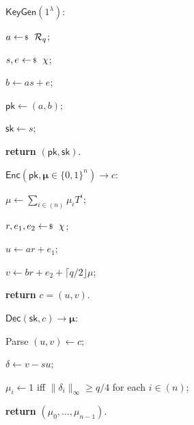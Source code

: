 \documentclass[../../book.tex]{subfiles}
\begin{document}
\begin{algoproto}[ht]
    \small
    \centering
    \begin{mdframed}[linecolor=black, linewidth=1pt,
                     skipabove=10pt, skipbelow=10pt,
                     innerleftmargin=5pt, innerrightmargin=5pt]
        \begin{minipage}[t]{0.25\linewidth}
            \colorbox{oc-blue-1}{$\mathsf{KeyGen}(1^{\lambda})$:}
            \begin{algoen}
                \item $a \leftarrowS \mathcal{R}_q$;
                \item $s, e \leftarrowS \chi$;
                \item $b \gets as + e$;
                \item $\mathsf{pk} \gets (a, b)$;
                \item $\mathsf{sk} \gets s$;
                \item \textbf{return} $(\mathsf{pk}, \mathsf{sk})$.
            \end{algoen}
        \end{minipage}
        \hfill
        \begin{minipage}[t]{0.35\linewidth}
            \colorbox{oc-blue-1}{$\mathsf{Enc}(\mathsf{pk}, \boldsymbol{\mu} \in \{0,1\}^n) \to c$:}
            \begin{algoen}
                \item $\mu \gets \sum_{i \in (n)} \mu_i T^i$;
                \item $r, e_1, e_2 \leftarrowS \chi$;
                \item $u \gets ar + e_1$;
                \item $v \gets br + e_2 + \lceil q/2 \rfloor \mu$;
                \item \textbf{return} $c = (u, v)$.
            \end{algoen}
        \end{minipage}
        \hfill
        \begin{minipage}[t]{0.35\linewidth}
            \colorbox{oc-blue-1}{$\mathsf{Dec}(\mathsf{sk}, c) \to \boldsymbol{\mu}$:}
            \begin{algoen}
                \item Parse $(u, v) \gets c$;
                \item $\delta \gets v - su$;
                \item $\mu_i \gets 1$ iff $\|\delta_i\|_{\infty} \geq q/4$ for each $i \in (n)$;
                \item \textbf{return} $(\mu_0,\dots,\mu_{n-1})$.
            \end{algoen}
        \end{minipage}
    \end{mdframed}
    \caption{Key generation, encryption, and decryption in the Ring-LWE-based scheme $\Pi_{\mathsf{PKE}}^{\text{RLWE}}$ over $\mathcal{R}_q = \mathbb{Z}_q[T]/(T^n+1)$, where $\chi$ is a short distribution over $S_{\eta} \subseteq \mathcal{R}_q$ and $\delta_i$ denotes the $i$-th coefficient of $\delta$.}
    \label{fig:rlwe-pke}
\end{algoproto}
\end{document}
